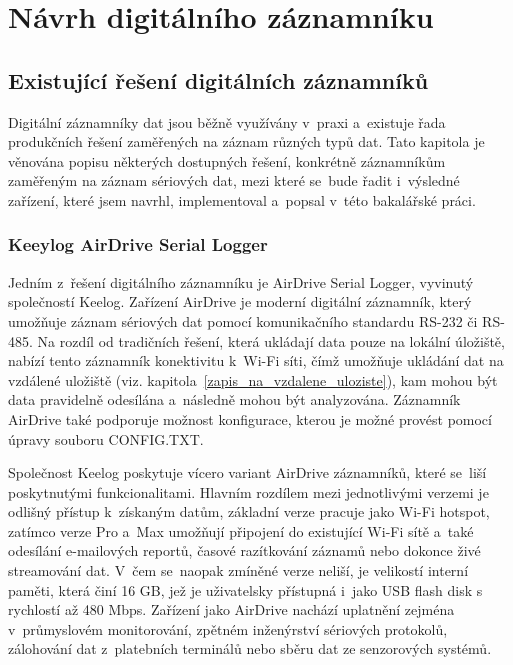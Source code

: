 \chapter{Návrh digitálního záznamníku}
\label{navrh_digitalniho_zaznamniku}

\section{Existující řešení digitálních záznamníků}
\label{existujici_reseni}
Digitální záznamníky dat jsou běžně využívány v~praxi a~existuje řada produkčních řešení zaměřených na záznam různých typů dat. Tato kapitola je věnována popisu některých dostupných řešení, konkrétně záznamníkům zaměřeným na záznam sériových dat, mezi které se~bude řadit i~výsledné zařízení, které jsem navrhl, implementoval a~popsal v~této bakalářské práci. 

\subsection{Keeylog AirDrive Serial Logger}
\label{keelog_airdrive_serial_datalogger}
Jedním z~řešení digitálního záznamníku je AirDrive Serial Logger, vyvinutý společností Keelog. Zařízení AirDrive je moderní digitální záznamník, který umožňuje záznam sériových dat pomocí komunikačního standardu RS-232 či RS-485. Na rozdíl od tradičních řešení, která ukládají data pouze na lokální úložiště, nabízí tento záznamník konektivitu k~Wi-Fi síti, čímž umožňuje ukládání dat na vzdálené uložiště (viz. kapitola~\ref{zapis_na_vzdalene_uloziste}), kam mohou být data pravidelně odesílána a~následně mohou být analyzována. Záznamník AirDrive také podporuje možnost konfigurace, kterou je možné provést pomocí úpravy souboru 
CONFIG.TXT.~\cite{keelog_airdrive_serial_datalogger, keelog_airdrive_serial_datalogger_pro}

Společnost Keelog poskytuje vícero variant AirDrive záznamníků, které se~liší poskytnutými funkcionalitami. Hlavním rozdílem mezi jednotlivými verzemi je odlišný přístup k~získaným datům, základní verze pracuje jako Wi-Fi hotspot, zatímco verze Pro a~Max umožňují připojení do existující Wi-Fi sítě a~také odesílání e-mailových reportů, časové razítkování záznamů nebo dokonce živé streamování dat. V~čem se~naopak zmíněné verze neliší, je velikostí interní paměti, která činí 16 GB, jež je uživatelsky přístupná i~jako USB flash disk s rychlostí až 480 Mbps. Zařízení jako AirDrive nachází uplatnění zejména v~průmyslovém monitorování, zpětném inženýrství sériových protokolů, zálohování dat z~platebních terminálů nebo sběru dat ze senzorových systémů.~\cite{keelog_airdrive_serial_datalogger, keelog_airdrive_serial_datalogger_pro}

